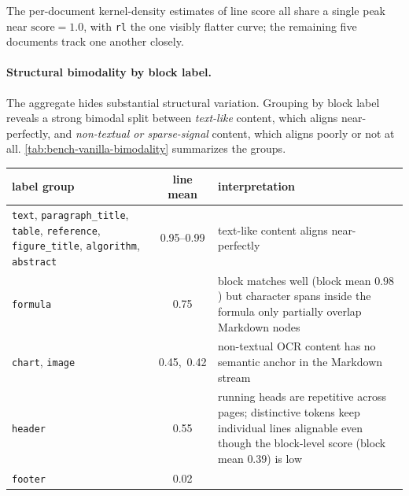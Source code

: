 \documentclass{article}
\theoremstyle{definition}
\begin{document}
The per-document kernel-density estimates of line score all share a
single peak near $\mathrm{score} = 1.0$, with \texttt{rl} the one
visibly flatter curve; the remaining five documents track one another
closely.

\paragraph{Structural bimodality by block label.}
The aggregate hides substantial structural variation.  Grouping by
block label reveals a strong bimodal split between \emph{text-like}
content, which aligns near-perfectly, and \emph{non-textual or
      sparse-signal} content, which aligns poorly or not at all.
\cref{tab:bench-vanilla-bimodality} summarizes the groups.

\begin{table}[h]
      \centering
      \small
      \begin{tabular}{@{}p{4.3cm}cp{6.3cm}@{}}
            \toprule
            \textbf{label group}                      & \textbf{line mean} & \textbf{interpretation} \\
            \midrule
            \texttt{text}, \texttt{paragraph\_title},
            \texttt{table}, \texttt{reference},
            \texttt{figure\_title}, \texttt{algorithm},
            \texttt{abstract}                         & 0.95--0.99         &
            text-like content aligns near-perfectly                                                  \\[2pt]
            \texttt{formula}                          & 0.75               &
            block matches well (block mean $0.98$) but character
            spans inside the formula only partially overlap Markdown
            nodes                                                                                    \\[2pt]
            \texttt{chart}, \texttt{image}            & 0.45,\ 0.42        &
            non-textual OCR content has no semantic anchor in the
            Markdown stream                                                                          \\[2pt]
            \texttt{header}                           & 0.55               &
            running heads are repetitive across pages; distinctive
            tokens keep individual lines alignable even though the
            block-level score (block mean $0.39$) is low                                             \\[2pt]
            \texttt{footer}                           & 0.02               &

\end{tabular}
\end{table}
\end{document}
